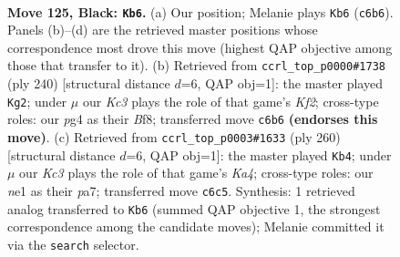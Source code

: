 \documentclass[11pt]{article}
\begin{document}
\begin{figure}[p]\centering
\begin{subfigure}{0.46\textwidth}\centering
\resizebox{\linewidth}{!}{%
\newchessgame
\chessboard[
  setfen={8/R7/2k5/4K3/6P1/8/8/1r2N3 b - - 34 125},
  showmover=false,
  pgfstyle=straightmove, color=movearrow, markmove={c6-b6}
]}
\caption{}
\end{subfigure}\hfill
\begin{subfigure}{0.46\textwidth}\centering
\resizebox{\linewidth}{!}{%
\newchessgame
\chessboard[
  setfen={5B2/R7/8/5k2/2n5/8/5K2/7r w - - 14 121},
  showmover=false,
  pgfstyle=straightmove, color=movearrow, markmove={f2-g2}
]}
\caption{}
\end{subfigure}
\\[4pt]
\begin{subfigure}{0.46\textwidth}\centering
\resizebox{\linewidth}{!}{%
\newchessgame
\chessboard[
  setfen={8/p7/P2k4/7r/K7/2R5/8/8 w - - 2 131},
  showmover=false,
  pgfstyle=straightmove, color=movearrow, markmove={a4-b4}
]}
\caption{}
\end{subfigure}\hfill

\caption{\textbf{Move 125, Black: \texttt{Kb6}.} (a) Our position; Melanie plays \texttt{Kb6} (\texttt{c6b6}). Panels (b)--(d) are the retrieved master positions whose correspondence most drove this move (highest QAP objective among those that transfer to it). (b) Retrieved from \texttt{ccrl\_top\_p0000\#1738} (ply 240) [structural distance $d$=6, QAP obj=1]: the master played \texttt{Kg2}; under $\mu$ our \emph{Kc3} plays the role of that game's \emph{Kf2}; cross-type roles: our \emph{p}g4 as their \emph{B}f8; transferred move \texttt{c6b6} \textbf{(endorses this move)}. (c) Retrieved from \texttt{ccrl\_top\_p0003\#1633} (ply 260) [structural distance $d$=6, QAP obj=1]: the master played \texttt{Kb4}; under $\mu$ our \emph{Kc3} plays the role of that game's \emph{Ka4}; cross-type roles: our \emph{n}e1 as their \emph{p}a7; transferred move \texttt{c6c5}. Synthesis: 1 retrieved analog transferred to \texttt{Kb6} (summed QAP objective 1, the strongest correspondence among the candidate moves); Melanie committed it via the \texttt{search} selector.}
\label{fig:thought-m249}
\end{figure}
\end{document}
